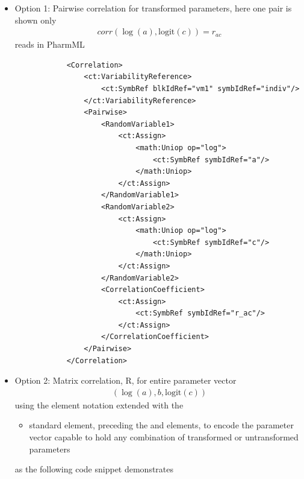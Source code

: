 \begin{itemize}
\item 
Option 1: Pairwise correlation for transformed parameters, here one
pair is shown only 
\begin{align}
corr(\log(a), \text{logit}(c)) = r_{ac}\nonumber 
\end{align}
reads in PharmML
\lstset{language=XML}
\begin{lstlisting}
            <Correlation>
                <ct:VariabilityReference>
                    <ct:SymbRef blkIdRef="vm1" symbIdRef="indiv"/>
                </ct:VariabilityReference>
                <Pairwise>
                    <RandomVariable1>
                        <ct:Assign>
                            <math:Uniop op="log">
                                <ct:SymbRef symbIdRef="a"/>
                            </math:Uniop>                            
                        </ct:Assign>
                    </RandomVariable1>
                    <RandomVariable2>
                        <ct:Assign>
                            <math:Uniop op="log">
                                <ct:SymbRef symbIdRef="c"/>
                            </math:Uniop>                            
                        </ct:Assign>
                    </RandomVariable2>
                    <CorrelationCoefficient>
                        <ct:Assign>
                            <ct:SymbRef symbIdRef="r_ac"/>
                        </ct:Assign>
                    </CorrelationCoefficient>
                </Pairwise>
            </Correlation>
\end{lstlisting}
\item 
Option 2: Matrix correlation, R, for entire parameter vector
\begin{align}
(\log(a), b, \text{logit}(c))\nonumber 
\end{align}
using the  element notation extended with the 
\begin{itemize}
\item 
standard  element, preceding the  and 
 elements, to encode the parameter vector 
capable to hold any combination of transformed or untransformed 
parameters
\end{itemize}
as the following code snippet demonstrates
 

\end{itemize}
